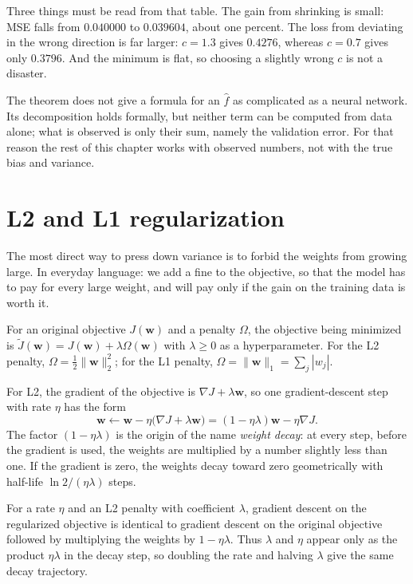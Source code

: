 Three things must be read from that table. The gain from shrinking is small: MSE
falls from $0.040000$ to $0.039604$, about one percent. The loss from deviating in
the wrong direction is far larger: $c=1.3$ gives $0.4276$, whereas $c=0.7$ gives
only $0.3796$. And the minimum is flat, so choosing a slightly wrong $c$ is not a
disaster.

The theorem does not give a formula for an $\hat f$ as complicated as a neural
network. Its decomposition holds formally, but neither term can be computed from
data alone; what is observed is only their sum, namely the validation error. For
that reason the rest of this chapter works with observed numbers, not with the true
bias and variance.
\section{L2 and L1 regularization}

The most direct way to press down variance is to forbid the weights from growing
large. In everyday language: we add a fine to the objective, so that the model has
to pay for every large weight, and will pay only if the gain on the training data
is worth it.


\begin{definisi}
For an original objective $J(\mathbf{w})$ and a penalty $\Omega$, the objective being
minimized is $\tilde J(\mathbf{w})=J(\mathbf{w})+\lambda\Omega(\mathbf{w})$ with
$\lambda\ge0$ as a hyperparameter. For the L2 penalty, $\Omega=\frac12\|\mathbf{w}\|_2^2$;
for the L1 penalty, $\Omega=\|\mathbf{w}\|_1=\sum_j|w_j|$.
\end{definisi}

For L2, the gradient of the objective is $\nabla J+\lambda\mathbf{w}$, so one
gradient-descent step with rate $\eta$ has the form
\[
\mathbf{w}\leftarrow\mathbf{w}-\eta\bigl(\nabla J+\lambda\mathbf{w}\bigr)
=(1-\eta\lambda)\mathbf{w}-\eta\nabla J .
\]
The factor $(1-\eta\lambda)$ is the origin of the name \emph{weight decay}: at every
step, before the gradient is used, the weights are multiplied by a number slightly
less than one. If the gradient is zero, the weights decay toward zero geometrically
with half-life $\ln 2/(\eta\lambda)$ steps.

\begin{akibat}
For a rate $\eta$ and an L2 penalty with coefficient $\lambda$, gradient descent on
the regularized objective is identical to gradient descent on the original
objective followed by multiplying the weights by $1-\eta\lambda$. Thus $\lambda$ and
$\eta$ appear only as the product $\eta\lambda$ in the decay step, so doubling the
rate and halving $\lambda$ give the same decay trajectory.
\end{akibat}

